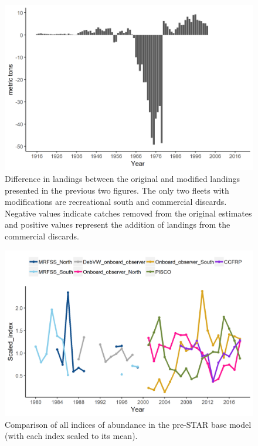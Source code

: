 \documentclass[12pt,]{article}
\begin{document}
\begin{figure}
\centering
\includegraphics{Figures/catches_difference.png}
\caption{Difference in landings between the original and modified
landings presented in the previous two figures. The only two fleets with
modifications are recreational south and commercial discards. Negative
values indicate catches removed from the original estimates and positive
values represent the addition of landings from the commercial discards.
\label{fig:catches_difference}}
\end{figure}

\FloatBarrier

\begin{figure}
\centering
\includegraphics{Figures/All_index_compare.png}
\caption{Comparison of all indices of abundance in the pre-STAR base
model (with each index scaled to its mean).
\label{fig:All_index_compare}}
\end{figure}
\end{document}
